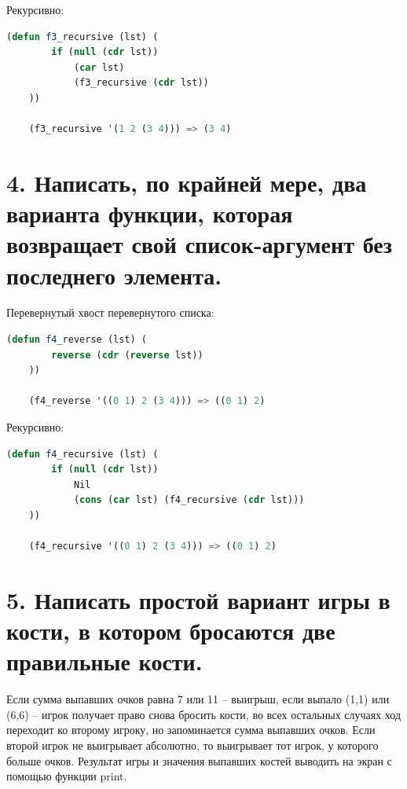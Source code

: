 \documentclass[12pt]{report}
\begin{document}
Рекурсивно:
\begin{lstlisting}[language=Lisp]
	(defun f3_recursive (lst) (
		if (null (cdr lst)) 
			(car lst) 	
			(f3_recursive (cdr lst))
	))
	
	(f3_recursive '(1 2 (3 4))) => (3 4)
\end{lstlisting}



\section*{4. Написать, по крайней мере, два варианта функции, которая возвращает свой список-аргумент без последнего элемента.}


Перевернутый хвост перевернутого списка:
\begin{lstlisting}[language=Lisp]
	(defun f4_reverse (lst) (
		reverse (cdr (reverse lst))
	))
	
	(f4_reverse '((0 1) 2 (3 4))) => ((0 1) 2)
\end{lstlisting}

Рекурсивно:
\begin{lstlisting}[language=Lisp]
	(defun f4_recursive (lst) (
		if (null (cdr lst)) 
			Nil 
			(cons (car lst) (f4_recursive (cdr lst)))
	))
	
	(f4_recursive '((0 1) 2 (3 4))) => ((0 1) 2)
\end{lstlisting}


\section*{5. Написать простой вариант игры в кости, в котором бросаются две правильные кости.}

Если сумма выпавших очков равна 7 или 11 -- выигрыш, если выпало (1,1) или (6,6) -- игрок получает право снова бросить кости, во всех остальных случаях ход переходит ко второму игроку, но запоминается сумма выпавших очков. Если второй игрок не выигрывает абсолютно, то выигрывает тот игрок, у которого больше очков. Результат игры и значения выпавших костей выводить на экран с помощью функции print.
\end{document}
